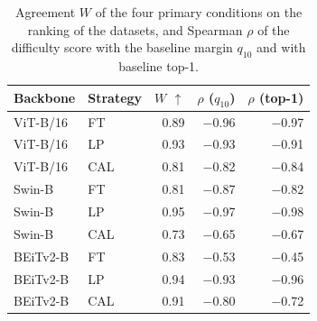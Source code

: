 \begin{table}[t]
\centering
\caption{Agreement $W$ of the four primary conditions on the ranking of the {} datasets, and Spearman $\rho$ of the difficulty score with the baseline margin $q_{10}$ and with baseline top-1.}
\label{tab:gatesShort}
\setlength{\tabcolsep}{3pt}
\small
\begin{tabular}{llrrr}
\toprule
Backbone & Strategy & $W$ $\uparrow$ & $\rho$ ($q_{10}$) & $\rho$ (top-1) \\
\midrule
ViT-B/16 & FT & 0.89 & $-$0.96 & $-$0.97 \\
ViT-B/16 & LP & 0.93 & $-$0.93 & $-$0.91 \\
ViT-B/16 & CAL & 0.81 & $-$0.82 & $-$0.84 \\
Swin-B & FT & 0.81 & $-$0.87 & $-$0.82 \\
Swin-B & LP & 0.95 & $-$0.97 & $-$0.98 \\
Swin-B & CAL & 0.73 & $-$0.65 & $-$0.67 \\
BEiTv2-B & FT & 0.83 & $-$0.53 & $-$0.45 \\
BEiTv2-B & LP & 0.94 & $-$0.93 & $-$0.96 \\
BEiTv2-B & CAL & 0.91 & $-$0.80 & $-$0.72 \\
\bottomrule
\end{tabular}
\end{table}
